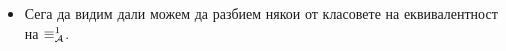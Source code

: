 \begin{extra2}
\begin{example}
\begin{itemize}

    
    \begin{tabular}{|c|c|c|c|c|c|c|}
      \hline
      $\equiv^0_\A$ & \multicolumn{3}{|c|}{$A_0$} & \multicolumn{3}{|c|}{$A_1$}\\
      \hline
      \hline
      $Q$ & $0$ & $1$ & $2$ & $3^\star$ & $4^\star$ & $5^\star$ \\
      \hline
      $a$ & $A_0$& $A_1$ & $A_1$ & $A_1$ & $A_1$ & $A_1$\\
      \hline
      $b$ & $A_0$& $A_1$ & $A_1$ & $A_1$ & $A_1$ & $A_1$\\
      \hline
    \end{tabular}
    
    Виждаме, че $0 \not\equiv^1_\A 1$ и $1 \equiv^1_\A 2$.
    Класовете на еквивалентност на $\equiv^1_\A$ са следните множества:
    \begin{align*}
      & B_0 = \{0\},\\
      & B_1 = \{1,2\},\\
      & B_2 = \{3,4,5\}.
    \end{align*}
  \item
    Сега да видим дали можем да разбием някои от класовете на еквивалентност на $\equiv^1_\A$.
    


\end{itemize}
\end{example}
\end{extra2}
